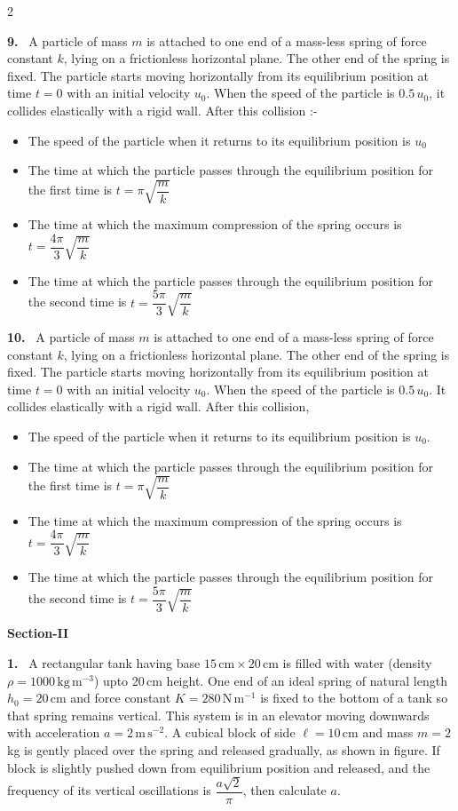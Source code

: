 \documentclass[10pt]{extarticle}
\newcommand{\sect}[1]{\par\smallskip\noindent\textbf{#1}\par}
\newcommand{\qn}[1]{\par\smallskip\noindent\textbf{#1.}~}
\newenvironment{qoptions}{\begin{itemize}[leftmargin=1.8em,itemsep=1pt,topsep=2pt,label={}]}{\end{itemize}}
\newcommand{\opt}[2]{\item[(#1)] #2}
\begin{document}
\begin{multicols}{2}
\qn{9} A particle of mass $m$ is attached to one end of a mass-less spring of force constant $k$, lying on a frictionless horizontal plane. The other end of the spring is fixed. The particle starts moving horizontally from its equilibrium position at time $t=0$ with an initial velocity $u_0$. When the speed of the particle is $0.5\,u_0$, it collides elastically with a rigid wall. After this collision :-
\begin{qoptions}
\opt{A}{The speed of the particle when it returns to its equilibrium position is $u_0$}
\opt{B}{The time at which the particle passes through the equilibrium position for the first time is $t=\pi\sqrt{\dfrac mk}$}
\opt{C}{The time at which the maximum compression of the spring occurs is $t=\dfrac{4\pi}{3}\sqrt{\dfrac mk}$}
\opt{D}{The time at which the particle passes through the equilibrium position for the second time is $t=\dfrac{5\pi}{3}\sqrt{\dfrac mk}$}
\end{qoptions}
\qn{10} A particle of mass $m$ is attached to one end of a mass-less spring of force constant $k$, lying on a frictionless horizontal plane. The other end of the spring is fixed. The particle starts moving horizontally from its equilibrium position at time $t=0$ with an initial velocity $u_0$. When the speed of the particle is $0.5\,u_0$. It collides elastically with a rigid wall. After this collision,
\begin{qoptions}
\opt{A}{The speed of the particle when it returns to its equilibrium position is $u_0$.}
\opt{B}{The time at which the particle passes through the equilibrium position for the first time is $t=\pi\sqrt{\dfrac mk}$}
\opt{C}{The time at which the maximum compression of the spring occurs is $t=\dfrac{4\pi}{3}\sqrt{\dfrac mk}$}
\opt{D}{The time at which the particle passes through the equilibrium position for the second time is $t=\dfrac{5\pi}{3}\sqrt{\dfrac mk}$}
\end{qoptions}
\sect{Section-II}
\qn{1} A rectangular tank having base $15\,\mathrm{cm}\times20\,\mathrm{cm}$ is filled with water (density $\rho=1000\,\mathrm{kg\,m^{-3}}$) upto 20\,cm height. One end of an ideal spring of natural length $h_0=20$\,cm and force constant $K=280\,\mathrm{N\,m^{-1}}$ is fixed to the bottom of a tank so that spring remains vertical. This system is in an elevator moving downwards with acceleration $a=2\,\mathrm{m\,s^{-2}}$. A cubical block of side $\ell=10$\,cm and mass $m=2$\,kg is gently placed over the spring and released gradually, as shown in figure. If block is slightly pushed down from equilibrium position and released, and the frequency of its vertical oscillations is $\dfrac{a\sqrt2}{\pi}$, then calculate $a$.

\end{multicols}
\end{document}
